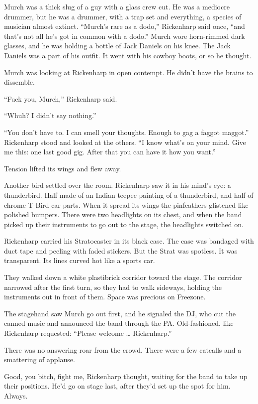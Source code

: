 Murch was a thick slug of a guy with a glass crew cut. He was a mediocre drummer, but he was a drummer, with a trap set and everything, a species of musician almost extinct. “Murch’s rare as a dodo,” Rickenharp said once, “and that’s not all he’s got in common with a dodo.” Murch wore horn-rimmed dark glasses, and he was holding a bottle of Jack Daniels on his knee. The Jack Daniels was a part of his outfit. It went with his cowboy boots, or so he thought.

Murch was looking at Rickenharp in open contempt. He didn’t have the brains to dissemble.

“Fuck you, Murch,” Rickenharp said.

“Whuh? I didn’t say nothing.”

“You don’t have to. I can smell your thoughts. Enough to gag a faggot maggot.” Rickenharp stood and looked at the others. “I know what’s on your mind. Give me this: one last good gig. After that you can have it how you want.”

Tension lifted its wings and flew away.

Another bird settled over the room. Rickenharp saw it in his mind’s eye: a thunderbird. Half made of an Indian teepee painting of a thunderbird, and half of chrome T-Bird car parts. When it spread its wings the pinfeathers glistened like polished bumpers. There were two headlights on its chest, and when the band picked up their instruments to go out to the stage, the headlights switched on.

Rickenharp carried his Stratocaster in its black case. The case was bandaged with duct tape and peeling with faded stickers. But the Strat was spotless. It was transparent. Its lines curved hot like a sports car.

They walked down a white plastibrick corridor toward the stage. The corridor narrowed after the first turn, so they had to walk sideways, holding the instruments out in front of them. Space was precious on Freezone.

The stagehand saw Murch go out first, and he signaled the DJ, who cut the canned music and announced the band through the PA. Old-fashioned, like Rickenharp requested: “Please welcome … Rickenharp.”

There was no answering roar from the crowd. There were a few catcalls and a smattering of applause.

Good, you bitch, fight me, Rickenharp thought, waiting for the band to take up their positions. He’d go on stage last, after they’d set up the spot for him. Always.

